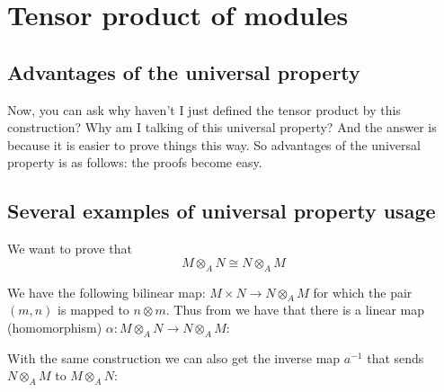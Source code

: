 \section{Tensor product of modules}

\subsection{Advantages of the universal property}
Now, you can ask  why haven't I just defined the tensor product by
this construction? Why am I talking of this universal property? 
And the answer is because it is easier to prove things this way. 
So advantages of the universal property is as follows: the proofs
become easy.

\subsection{Several examples of universal property usage}

\begin{example}
  We want to prove that
  \[
  M \otimes_A N \cong N \otimes_A M
  \]

  We have the following bilinear map:
  $M \times N \to N \otimes_A M$ for which the pair
  $(m,n)$ is mapped to $n \otimes m$. Thus from
   we have that there is a linear map
  (homomorphism)
  $\alpha: M \otimes_A N \to N \otimes_A M$:
  

  
  With the same
  construction we can also get the inverse map $a^{-1}$ that sends
  $N \otimes_A M$ to $M \otimes_A N$:
  
  
\end{example}

